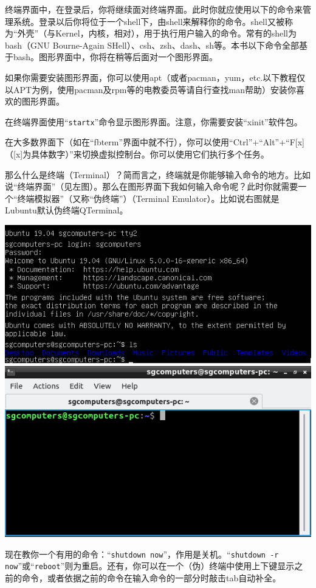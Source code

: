 终端界面中，在登录后，你将继续面对终端界面。此时你就应使用以下的命令来管理系统。登录以后你将位于一个shell下，由shell来解释你的命令。shell又被称为“外壳”（与Kernel，内核，相对），用于执行用户输入的命令。常有的shell为bash（GNU Bourne-Again SHell）、csh、zsh、dash、sh等。本书以下命令全部基于bash。图形界面中，你将在稍等后面对一个图形界面。\par
如果你需要安装图形界面，你可以使用apt（或者pacman，yum，etc.以下教程仅以APT为例，使用pacman及rpm等的电教委员等请自行查找man帮助）安装你喜欢的图形界面。\par
在终端界面使用“\verb|startx|”命令显示图形界面。注意，你需要安装“xinit”软件包。\par
在大多数界面下（如在“fbterm”界面中就不行），你可以使用“Ctrl”+“Alt”+“F[x]（[x]为具体数字）”来切换虚拟控制台。你可以使用它们执行多个任务。\par
那么什么是终端（Terminal）？简而言之，终端就是你能够输入命令的地方。比如说“终端界面”（见左图）。那么在图形界面下我如何输入命令呢？此时你就需要一个“终端模拟器”（又称“伪终端”）（Terminal Emulator）。比如说右图就是Lubuntu默认伪终端QTerminal。
\begin{center}
	\includegraphics[scale=0.9]{pic/term1} \includegraphics[scale=0.9]{pic/term2}
\end{center} \par
现在教你一个有用的命令：“\verb|shutdown now|”，作用是关机。“\verb|shutdown -r now|”或“\verb|reboot|”则为重启。还有，你可以在一个（伪）终端中使用上下键显示之前的命令，或者依据之前的命令在输入命令的一部分时敲击tab自动补全。
